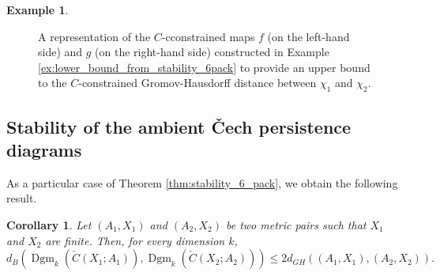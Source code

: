\documentclass[8pt,a4paper,oneside,english,english]{article}
\theoremstyle{plain}
\theoremstyle
{plain}
\newtheorem{corollary}[theorem]{Corollary}%
\theoremstyle{definition}
\newtheorem{example}[theorem]{Example}%
\newcommand{\GH}{d_{GH}}
\DeclareMathOperator{\Dgm}{Dgm}
\begin{document}
\begin{example}
\begin{figure}[h!]
        \caption{\footnotesize A representation of the $C$-cconstrained maps $f$ (on the left-hand side) and $g$ (on the right-hand side) constructed in Example \ref{ex:lower_bound_from_stability_6pack} to provide an upper bound to the $C$-constrained Gromov-Hausdorff distance between $\chi_1$ and $\chi_2$.}
        \label{fig:lower_bound_from_stability_6pack_maps}
    \end{figure}
\end{example}


\subsection{Stability of the ambient \v{C}ech persistence diagrams}\label{sub:Cech_stability}


As a particular case of Theorem \ref{thm:stability_6_pack}, we obtain the following result.
\begin{corollary}\label{coro:stability_ambient_cech}
	Let $(A_1,X_1)$ and $(A_2,X_2)$ be two metric pairs such that $X_1$ and $X_2$ are finite. Then, for every dimension $k$,
	\[
	d_B(\Dgm_k(\check{C}(X_1;A_1)),\Dgm_k(\check{C}(X_2;A_2)))\leq 2\GH((A_1,X_1),(A_2,X_2)).
	\]
\end{corollary}
\end{document}

